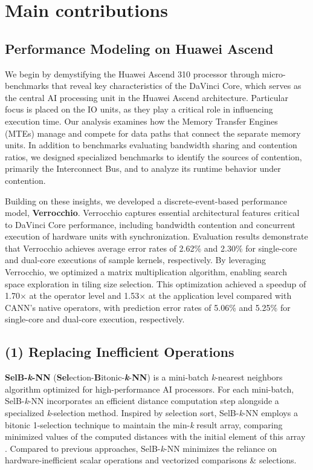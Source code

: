 \section{Main contributions}
\label{sec_1_3_contributions}

\subsection{Performance Modeling on Huawei Ascend}

We begin by demystifying the Huawei Ascend 310 processor through micro-benchmarks that reveal key characteristics of the DaVinci Core, which serves as the central AI processing unit in the Huawei Ascend architecture. Particular focus is placed on the IO units, as they play a critical role in influencing execution time. Our analysis examines how the Memory Transfer Engines (MTEs) manage and compete for data paths that connect the separate memory units. In addition to benchmarks evaluating bandwidth sharing and contention ratios, we designed specialized benchmarks to identify the sources of contention, primarily the Interconnect Bus, and to analyze its runtime behavior under contention.

Building on these insights, we developed a discrete-event-based performance model, \textbf{Verrocchio}. Verrocchio captures essential architectural features critical to DaVinci Core performance, including bandwidth contention and concurrent execution of hardware units with synchronization. Evaluation results demonstrate that Verrocchio achieves average error rates of 2.62\% and 2.30\% for single-core and dual-core executions of sample kernels, respectively. By leveraging Verrocchio, we optimized a matrix multiplication algorithm, enabling search space exploration in tiling size selection. This optimization achieved a speedup of 1.70$\times$ at the operator level and 1.53$\times$ at the application level compared with CANN's \cite{CANN} native operators, with prediction error rates of 5.06\% and 5.25\% for single-core and dual-core execution, respectively.

\subsection{(1) Replacing Inefficient Operations}

\textbf{SelB-\textit{k}-NN} (\textbf{Sel}ection-\textbf{B}itonic-\textbf{\textit{k}}-\textbf{NN}) is a mini-batch \textit{k}-nearest neighbors algorithm optimized for high-performance AI processors. For each mini-batch, SelB-\textit{k}-NN incorporates an efficient distance computation step alongside a specialized \textit{k}-selection method. Inspired by selection sort, SelB-\textit{k}-NN employs a bitonic 1-selection technique to maintain the min-\textit{k} result array, comparing minimized values of the computed distances with the initial element of this array \cite{DBLP:conf/sigmod/ShanbhagPM18}. Compared to previous approaches, SelB-\textit{k}-NN minimizes the reliance on hardware-inefficient scalar operations and vectorized comparisons \& selections.

